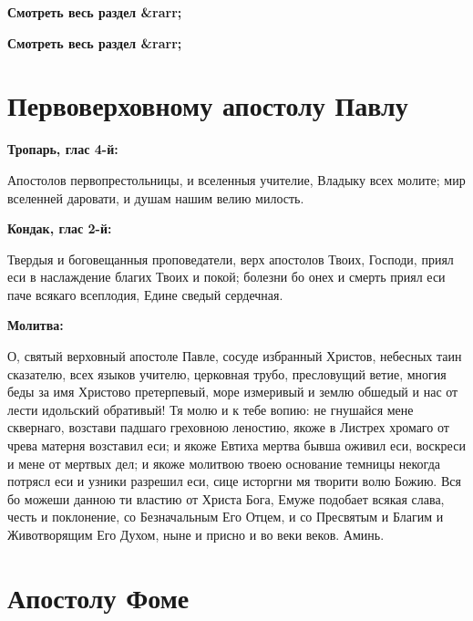 


\bfseries Смотреть весь раздел &rarr;\normalfont{} 


\bfseries Смотреть весь раздел &rarr;\normalfont{} 

\section{Первоверховному апостолу Павлу}
 


\bfseries Тропарь, глас 4-й:\normalfont{}


Апостолов первопрестольницы, и вселенныя учителие, Владыку всех молите; мир вселенней даровати, и душам нашим велию милость.


\medskip


\bfseries Кондак, глас 2-й:\normalfont{}


Твердыя и боговещанныя проповедатели, верх апостолов Твоих, Господи, приял еси в наслаждение благих Твоих и покой; болезни бо онех и смерть приял еси паче всякаго всеплодия, Едине сведый сердечная.


\medskip


\bfseries Молитва:\normalfont{}


О, святый верховный апостоле Павле, сосуде избранный Христов, небесных таин сказателю, всех языков учителю, церковная трубо, пресловущий ветие, многия беды за имя Христово претерпевый, море измеривый и землю обшедый и нас от лести идольский обративый! Тя молю и к тебе вопию: не гнушайся мене сквернаго, возстави падшаго греховною леностию, якоже в Листрех хромаго от чрева матерня возставил еси; и якоже Евтиха мертва бывша оживил еси, воскреси и мене от мертвых дел; и якоже молитвою твоею основание темницы некогда потрясл еси и узники разрешил еси, сице исторгни мя творити волю Божию. Вся бо можеши данною ти властию от Христа Бога, Емуже подобает всякая слава, честь и поклонение, со Безначальным Его Отцем, и со Пресвятым и Благим и Животворящим Его Духом, ныне и присно и во веки веков. Аминь.


\section{Апостолу Фоме}
 


